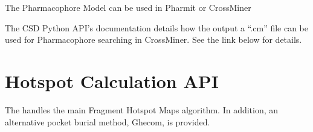 \documentclass[letterpaper,10pt,english]{sphinxmanual}
\begin{document}
\begin{sphinxVerbatim}[commandchars=\\\{\}]
   
  
  
\end{sphinxVerbatim}

The Pharmacophore Model can be used in Pharmit or CrossMiner

\begin{sphinxVerbatim}[commandchars=\\\{\}]
   
    
\end{sphinxVerbatim}

The CSD Python API’s documentation details how the output a “.cm” file can be used for Pharmacophore
searching in CrossMiner. See the link below for details.



\chapter{Hotspot Calculation API}
\label{\detokenize{calculation_api:module-hotspots.calculation}}\label{\detokenize{calculation_api:hotspot-calculation-api}}\label{\detokenize{calculation_api::doc}}
The {\hyperref[\detokenize{calculation_api:module-hotspots.calculation}]{}} handles the main Fragment Hotspot Maps algorithm. In addition, an alternative pocket burial method, Ghecom, is provided.
\end{document}
